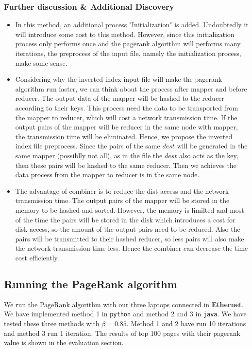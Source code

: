 \documentclass[a4paper]{article}
\begin{document}
\subsubsection{Further discussion \& Additional Discovery}
\begin{itemize}
	\item In this method, an additional process "Initialization" is added. Undoubtedly it will introduce some cost to this method. However, since this initialization process only performs once and the pagerank algorithm will performs many iterations, the preprocess of the input file, namely the initialization process, make some sense. 
	\item Considering why the inverted index input file will make the pagerank algorithm run faster, we can think about the process after mapper and before reducer. The output data of the mapper will be hashed to the reducer according to their keys. This process need the data to be transported from the mapper to reducer, which will cost a network transmission time. If the output pairs of the mapper will be reducer in the same node with mapper, the transmission time will be eliminated. Hence, we propose the inverted index file preprocess. Since the pairs of the same $dest$ will be generated in the same mapper (possiblly not all), as in the file the $dest$ also acts as the key, then these pairs will be hashed to the same reducer. Then we achieves the data process from the mapper to reducer is in the same node.
	\item The advantage of combiner is to reduce the dist access and the network transmission time. The output pairs of the mapper will be stored in the memory to be hashed and sorted. However, the memory is limilted and most of the time the pairs will be stored in the disk which introduces a cost for disk access, so the amount of the output pairs need to be reduced. Also the pairs will be transmitted to their hashed reducer, so less pairs will also make the network transmission time less. Hence the combiner can decrease the time cost efficiently.
\end{itemize}

\subsection{Running the PageRank algorithm}
We run the PageRank algorithm with our three laptops connected in \textbf{Ethernet}. We have implemented method 1 in \texttt{python} and method 2 and 3 in \texttt{java}. We have tested these three methods with $\beta = 0.85$. Method 1 and 2 have run 10 iterations and method 3 run 1 iteration. The results of top 100 pages with their pagerank value is shown in the evaluation section.
\end{document}
